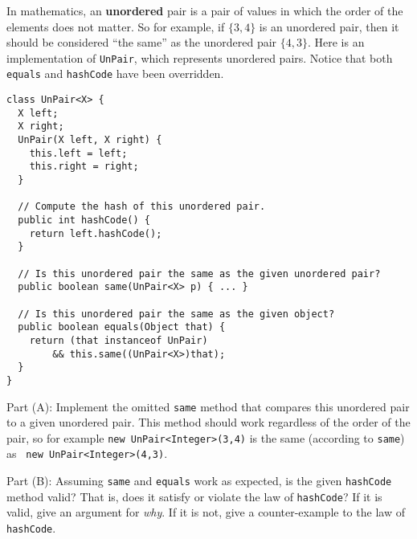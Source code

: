 \documentclass[12pt]{article}                   %
\def\pts#1{\marginpar{\footnotesize \raggedright  \fbox{#1 {\sc Points}}}}
\begin{document}
\begin{problem} \pts{??}

In mathematics, an {\bf unordered} pair is a pair of values in which
the order of the elements does not matter.  So for example, if
$\{3,4\}$ is an unordered pair, then it should be considered ``the
same'' as the unordered pair $\{4,3\}$.  Here is an implementation of
{\tt UnPair}, which represents unordered pairs.  Notice that both {\tt
  equals} and {\tt hashCode} have been overridden.

\begin{verbatim}
class UnPair<X> {
  X left;
  X right;
  UnPair(X left, X right) {
    this.left = left;
    this.right = right;
  }

  // Compute the hash of this unordered pair.
  public int hashCode() {
    return left.hashCode();
  }

  // Is this unordered pair the same as the given unordered pair?
  public boolean same(UnPair<X> p) { ... }

  // Is this unordered pair the same as the given object?
  public boolean equals(Object that) {
    return (that instanceof UnPair)
        && this.same((UnPair<X>)that);
  }
}
\end{verbatim}

\newpage
\noindent
Part (A): Implement the omitted {\tt same} method that compares this
unordered pair to a given unordered pair.  This method should work
regardless of the order of the pair, so for example {\tt new
  UnPair<Integer>(3,4)} is the same (according to {\tt same}) as {\tt
  new UnPair<Integer>(4,3)}.

\newpage
\noindent
Part (B): Assuming {\tt same} and {\tt equals} work as expected, is
the given {\tt hashCode} method valid?  That is, does it satisfy or
violate the law of {\tt hashCode}?  If it is valid, give an argument
for \emph{why}.  If it is not, give a counter-example to the law of
{\tt hashCode}.
\end{problem}
\newpage
\end{document}
